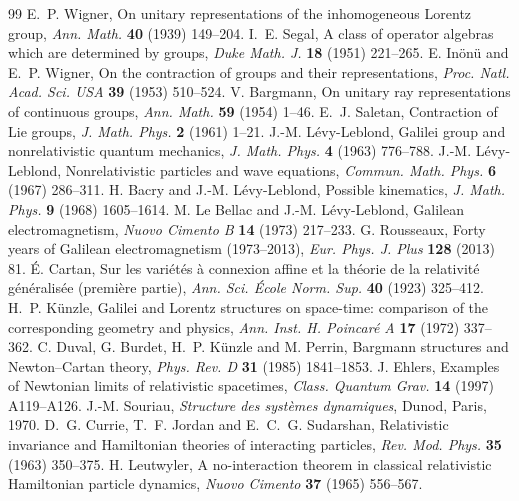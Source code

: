 \documentclass[11pt,a4paper]{article}
\theoremstyle{plain}
\theoremstyle{definition}
\theoremstyle{remark}
\begin{document}
\begin{thebibliography}{99}\small
{} E.~P. Wigner, On unitary representations of the inhomogeneous Lorentz group, \emph{Ann. Math.} \textbf{40} (1939) 149--204.
 I.~E. Segal, A class of operator algebras which are determined by groups, \emph{Duke Math. J.} \textbf{18} (1951) 221--265.
 E. In\"on\"u and E.~P. Wigner, On the contraction of groups and their representations, \emph{Proc. Natl. Acad. Sci. USA} \textbf{39} (1953) 510--524.
 V. Bargmann, On unitary ray representations of continuous groups, \emph{Ann. Math.} \textbf{59} (1954) 1--46.
 E.~J. Saletan, Contraction of Lie groups, \emph{J. Math. Phys.} \textbf{2} (1961) 1--21.
 J.-M. L\'evy-Leblond, Galilei group and nonrelativistic quantum mechanics, \emph{J. Math. Phys.} \textbf{4} (1963) 776--788.
 J.-M. L\'evy-Leblond, Nonrelativistic particles and wave equations, \emph{Commun. Math. Phys.} \textbf{6} (1967) 286--311.
 H. Bacry and J.-M. L\'evy-Leblond, Possible kinematics, \emph{J. Math. Phys.} \textbf{9} (1968) 1605--1614.
 M. Le Bellac and J.-M. L\'evy-Leblond, Galilean electromagnetism, \emph{Nuovo Cimento B} \textbf{14} (1973) 217--233.
 G. Rousseaux, Forty years of Galilean electromagnetism (1973--2013), \emph{Eur. Phys. J. Plus} \textbf{128} (2013) 81.
 \'E. Cartan, Sur les vari\'et\'es \`a connexion affine et la th\'eorie de la relativit\'e g\'en\'eralis\'ee (premi\`ere partie), \emph{Ann. Sci. \'Ecole Norm. Sup.} \textbf{40} (1923) 325--412.
 H.~P. K\"unzle, Galilei and Lorentz structures on space-time: comparison of the corresponding geometry and physics, \emph{Ann. Inst. H. Poincar\'e A} \textbf{17} (1972) 337--362.
 C. Duval, G. Burdet, H.~P. K\"unzle and M. Perrin, Bargmann structures and Newton--Cartan theory, \emph{Phys. Rev. D} \textbf{31} (1985) 1841--1853.
 J. Ehlers, Examples of Newtonian limits of relativistic spacetimes, \emph{Class. Quantum Grav.} \textbf{14} (1997) A119--A126.
 J.-M. Souriau, \emph{Structure des syst\`emes dynamiques}, Dunod, Paris, 1970.
 D.~G. Currie, T.~F. Jordan and E.~C.~G. Sudarshan, Relativistic invariance and Hamiltonian theories of interacting particles, \emph{Rev. Mod. Phys.} \textbf{35} (1963) 350--375.
 H. Leutwyler, A no-interaction theorem in classical relativistic Hamiltonian particle dynamics, \emph{Nuovo Cimento} \textbf{37} (1965) 556--567.

\end{thebibliography}
\end{document}
